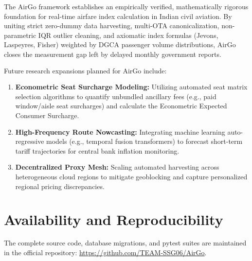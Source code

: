 \documentclass[11pt,a4paper]{article}
\begin{document}
The AirGo framework establishes an empirically verified, mathematically rigorous foundation for real-time airfare index calculation in Indian civil aviation. By uniting strict zero-dummy data harvesting, multi-OTA canonicalization, non-parametric IQR outlier cleaning, and axiomatic index formulas (Jevons, Laspeyres, Fisher) weighted by DGCA passenger volume distributions, AirGo closes the measurement gap left by delayed monthly government reports.

Future research expansions planned for AirGo include:
\begin{enumerate}
    \item \textbf{Econometric Seat Surcharge Modeling:} Utilizing automated seat matrix selection algorithms to quantify unbundled ancillary fees (e.g., paid window/aisle seat surcharges) and calculate the Econometric Expected Consumer Surcharge.
    \item \textbf{High-Frequency Route Nowcasting:} Integrating machine learning auto-regressive models (e.g., temporal fusion transformers) to forecast short-term tariff trajectories for central bank inflation monitoring.
    \item \textbf{Decentralized Proxy Mesh:} Scaling automated harvesting across heterogeneous cloud regions to mitigate geoblocking and capture personalized regional pricing discrepancies.
\end{enumerate}

\section*{Availability and Reproducibility}
The complete source code, database migrations, and pytest suites are maintained in the official repository: \url{https://github.com/TEAM-SSG06/AirGo}.
\end{document}
